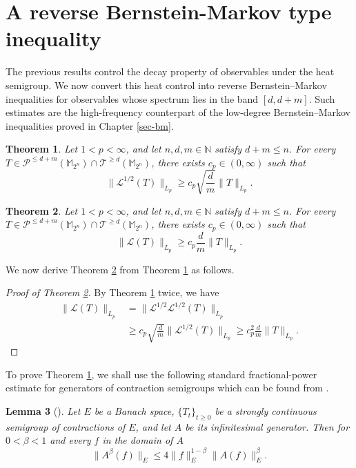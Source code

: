 \documentclass{amsbook}
\newtheorem{theorem}{Theorem}[chapter]
\newtheorem{lemma}[theorem]{Lemma}
\theoremstyle{definition}
\theoremstyle{remark}
\numberwithin{section}{chapter}
\numberwithin{equation}{chapter}
\newcommand{\1}{\mathbf{1}}
\begin{document}
\section{A reverse Bernstein-Markov type inequality}
The previous results control the decay property of observables under the heat semigroup.  We now convert this heat control into reverse Bernstein--Markov inequalities for observables whose spectrum lies in the band $[d,d+m]$.  Such estimates are the high-frequency counterpart of the low-degree Bernstein--Markov inequalities proved in Chapter \ref{sec-bm}.

\begin{theorem}\label{d1-2-dtail-1} Let $1<p<\infty$, and let $n, d, m \in \mathbb{N}$  satisfy $d+m \leq n$.  For every $T\in\mathcal{P}^{\leq d+m}(\mathbb{M}_{2^n})\cap \mathcal{T}^{\geq d}(\mathbb{M}_{2^n})$, there exists $c_p \in(0, \infty)$ such that
	$$
	\|\mathcal{L}^{1 / 2} (T)\|_{L_{p}} \geq c_p \sqrt{\frac{d}{m}}\|T\|_{L_{p}}.$$
\end{theorem}


\begin{theorem}\label{rbm-d-tail}  Let $1<p<\infty$, and let $n, d, m \in \mathbb{N}$  satisfy $d+m \leq n$.  For every $T\in\mathcal{P}^{\leq d+m}(\mathbb{M}_{2^n})\cap \mathcal{T}^{\geq d}(\mathbb{M}_{2^n})$, there exists $c_p \in(0, \infty)$ such that
$$\|\mathcal{L}(T)\|_{L_{p}}\geq c_p \frac{d}{m}\|T\|_{L_{p}}.
$$
\end{theorem}

We now derive Theorem \ref{rbm-d-tail} from Theorem \ref{d1-2-dtail-1} as follows. 

\begin{proof}[Proof of Theorem \ref{rbm-d-tail}]  By Theorem \ref{d1-2-dtail-1} twice, we have
\begin{align*}
\|\mathcal{L}(T)\|_{L_{p}} & =\|\mathcal{L}^{1/2} \mathcal{L}^{1 / 2} (T)\|_{L_{p}} \\
& \geq c_p \sqrt{\frac{d}{m}}\|\mathcal{L}^{1 / 2} (T)\|_{L_{p}}  \geq c_p^{2} \frac{d}{m}\|T\|_{L_{p}}.
\end{align*}
\end{proof}


To prove Theorem \ref{d1-2-dtail-1}, we shall use the following standard fractional-power estimate for generators of contraction semigroups which can be found from \cite{EL2008}.

\begin{lemma}[{\cite[Lemma 5.6]{EL2008}}]\label{nsi}
Let $E$ be a Banach space, $\{T_{t}\}_{t\geq 0}$ be a strongly continuous semigroup of contractions of $E$, and let $A$ be its infinitesimal generator. Then for $0 <\beta< 1$ and every $f$ in the domain of $A$
\[
\|A^\beta (f)\|_E\leq 4\|f\|_E^{1-\beta}\|A(f)\|_E^\beta.
\]
\end{lemma}
\end{document}
